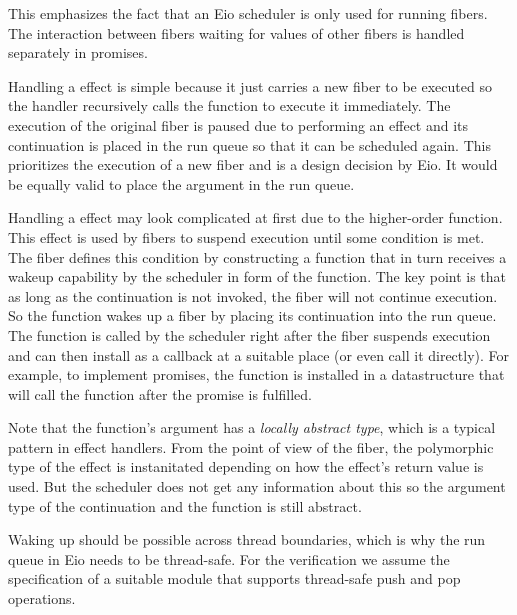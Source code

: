 This emphasizes the fact that an Eio scheduler is only used for running fibers.
The interaction between fibers waiting for values of other fibers is handled separately in promises.

Handling a \efork{} effect is simple because it just carries a new fiber to be executed so the handler recursively calls the  function to execute it immediately.
The execution of the original fiber is paused due to performing an effect and its continuation  is placed in the run queue so that it can be scheduled again.
This prioritizes the execution of a new fiber and is a design decision by Eio.
It would be equally valid to place the  argument in the run queue.

Handling a \esuspend{} effect may look complicated at first due to the higher-order  function.
This effect is used by fibers to suspend execution until some condition is met.
The fiber defines this condition by constructing a  function that in turn receives a wakeup capability by the scheduler in form of the  function.
The key point is that as long as the continuation  is not invoked, the fiber will not continue execution.
So the  function wakes up a fiber by placing its continuation into the run queue.
The  function is called by the scheduler right after the fiber suspends execution and can then install  as a callback at a suitable place (or even call it directly).
For example, to implement promises, the  function is installed in a datastructure that will call the function after the promise is fulfilled.

Note that the  function's argument  has a \textit{locally abstract type}, which is a typical pattern in effect handlers.
From the point of view of the fiber, the polymorphic type of the \esuspend{} effect is instanitated depending on how the effect's return value is used.
But the scheduler does not get any information about this so the argument type of the continuation  and the  function is still abstract.

Waking up should be possible across thread boundaries, which is why the run queue in Eio needs to be thread-safe.
For the verification we assume the specification of a suitable  module that supports thread-safe push and pop operations.


